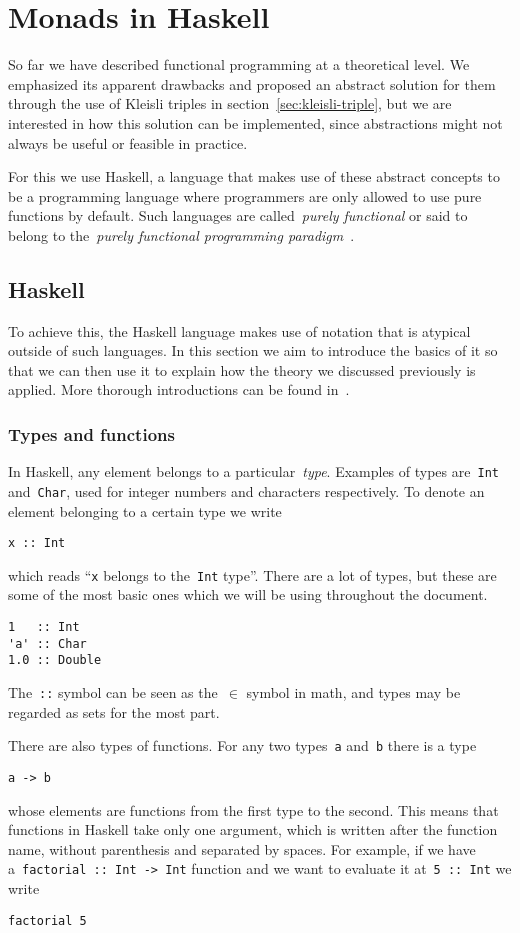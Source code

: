 \documentclass[../TFG.tex]{subfiles}
\begin{document}
\section{Monads in Haskell}
So far we have described functional programming at a theoretical level. We
emphasized its apparent drawbacks and proposed an abstract solution for them
through the use of Kleisli triples in section~\ref{sec:kleisli-triple}, but we
are interested in how this solution can be implemented, since abstractions might
not always be useful or feasible in practice.

For this we use Haskell, a language that makes use of these abstract concepts to
be a programming language where programmers are only allowed to use pure
functions by default. Such languages are called~\emph{purely functional} or said
to belong to the~\emph{purely functional programming
paradigm}~\cite{paradigms-overview}.

\subsection{Haskell}
To achieve this, the Haskell language makes use of notation that is atypical
outside of such languages. In this section we aim to introduce the basics of it
so that we can then use it to explain how the theory we discussed previously is
applied. More thorough introductions can be found in~\cite{haskell-org-docs}.

\subsubsection{Types and functions}
In Haskell, any element belongs to a particular~\emph{type}. Examples of types
are~\texttt{Int} and~\texttt{Char}, used for integer
numbers and characters respectively. To denote an element belonging to a certain
type we write
\begin{verbatim}
x :: Int
\end{verbatim}
which reads ``\texttt{x} belongs to the~\texttt{Int}
type''. There are a lot of types, but these are some of the most basic ones
which we will be using throughout the document.
\begin{verbatim}
1   :: Int
'a' :: Char
1.0 :: Double
\end{verbatim}
The~\texttt{::} symbol can be seen as the~\(\in\) symbol in math,
and types may be regarded as sets for the most part.

There are also types of functions. For any two types~\texttt{a}
and~\texttt{b} there is a type
\begin{verbatim}
a -> b
\end{verbatim}
whose elements are functions from the first type to the second. This means that
functions in Haskell take only one argument, which is written after the function
name, without parenthesis and separated by spaces. For example, if we have
a~\texttt{factorial :: Int -> Int} function and we want to evaluate
it at~\texttt{5 :: Int} we write
\begin{verbatim}
factorial 5
\end{verbatim}
\end{document}
